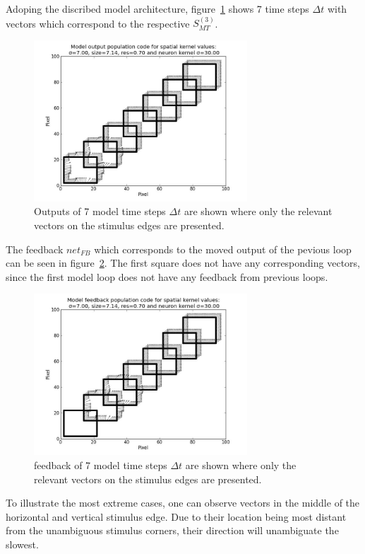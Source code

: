 \documentclass[a4paper]{article}
\begin{document}
Adoping the discribed model architecture, figure~\ref{fig:output} shows 7 time steps $\Delta t$ with vectors which correspond to the respective $S^{(3)}_{MT}$.

\vspace{0.5cm}
\begin{figure}[ht]
\centering
\includegraphics[width=8cm]{pics/output}
\caption{Outputs of 7 model time steps $\Delta t$ are shown where only the relevant vectors on the stimulus edges are presented.}
\label{fig:output}
\end{figure}
\vspace{0.5cm}

The feedback $net_{FB}$ which corresponds to the moved output of the pevious loop can be seen in figure~\ref{fig:feedback}. The first square does not have any corresponding vectors, since the first model loop does not have any feedback from previous loops.
\newpage
\begin{figure}[ht]
\centering
\includegraphics[width=8cm]{pics/feedback}
\caption{feedback of 7 model time steps $\Delta t$ are shown where only the relevant vectors on the stimulus edges are presented.}
\label{fig:feedback}
\end{figure}
\vspace{0.5cm}

To illustrate the most extreme cases, one can observe vectors in the middle of the horizontal and vertical stimulus edge. Due to their location being most distant from the unambiguous stimulus corners, their direction will unambiguate the slowest.\\
\end{document}
